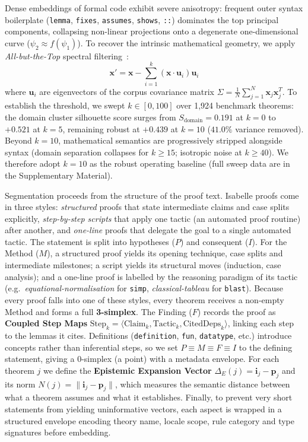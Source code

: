 \documentclass{svproc}
\begin{document}
Dense embeddings of formal code exhibit severe anisotropy: frequent outer syntax boilerplate (\texttt{lemma}, \allowbreak\texttt{fixes}, \allowbreak\texttt{assumes}, \allowbreak\texttt{shows}, \allowbreak\texttt{::}) dominates the top principal components, collapsing non-linear projections onto a degenerate one-\allowbreak dimen\-sional curve ($\psi_2 \approx f(\psi_1)$). To recover the intrinsic mathematical geometry, we apply \emph{All-but-the-Top} spectral filtering~\cite{mu2018all}:
\begin{equation}
\mathbf{x}' = \mathbf{x} - \sum_{i=1}^{k} (\mathbf{x} \cdot \mathbf{u}_i)\mathbf{u}_i
\end{equation}
where $\mathbf{u}_i$ are eigenvectors of the corpus covariance matrix $\Sigma = \frac{1}{N}\sum_{j=1}^N \mathbf{x}_j \mathbf{x}_j^T$. To establish the threshold, we swept $k \in [0, 100]$ over 1,924 benchmark theorems: the domain cluster silhouette score surges from $S_{\text{domain}} = 0.191$ at $k=0$ to $+0.521$ at $k=5$, remaining robust at $+0.439$ at $k=10$ ($41.0\%$ variance removed). Beyond $k=10$, mathematical semantics are progressively stripped alongside syntax (domain separation collapses for $k \ge 15$; isotropic noise at $k \ge 40$). We therefore adopt $k=10$ as the robust operating baseline (full sweep data are in the Supplementary Material).


Segmentation proceeds from the structure of the proof text. Isabelle proofs come in three styles: \emph{structured} proofs that state intermediate claims and case splits explicitly, \emph{step-by-step scripts} that apply one tactic (an automated proof routine) after another, and \emph{one-line} proofs that delegate the goal to a single automated tactic. The statement is split into hypotheses ($P$) and consequent ($I$). For the Method ($M$), a structured proof yields its opening technique, case splits and intermediate milestones; a script yields its structural moves (induction, case analysis); and a one-line proof is labelled by the reasoning paradigm of its tactic (e.g.\ \emph{equational-normalisation} for \texttt{simp}, \emph{classical-tableau} for \texttt{blast}). Because every proof falls into one of these styles, every theorem receives a non-empty Method and forms a full \textbf{3-simplex}. The Finding ($F$) records the proof as \textbf{Coupled Step Maps} $\text{Step}_k = \langle \text{Claim}_k, \text{Tactic}_k, \text{CitedDeps}_k \rangle$, linking each step to the lemmas it cites. Definitions (\texttt{definition}, \texttt{fun}, \texttt{datatype}, etc.) introduce concepts rather than inferential steps, so we set $P \equiv M \equiv F \equiv I$ to the defining statement, giving a 0-simplex (a point) with a metadata envelope. For each theorem $j$ we define the \textbf{Epistemic Expansion Vector} $\Delta_E(j) = \mathbf{i}_j - \mathbf{p}_j$ and its norm $N(j) = \|\mathbf{i}_j - \mathbf{p}_j\|$, which measures the semantic distance between what a theorem assumes and what it establishes. Finally, to prevent very short statements from yielding uninformative vectors, each aspect is wrapped in a structured envelope encoding theory name, locale scope, rule category and type signatures before embedding.
\end{document}
